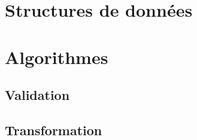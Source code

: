 \section{Structures de données}

    
\section{Algorithmes}

    \subsection{Validation}
        
    \subsection{Transformation}

